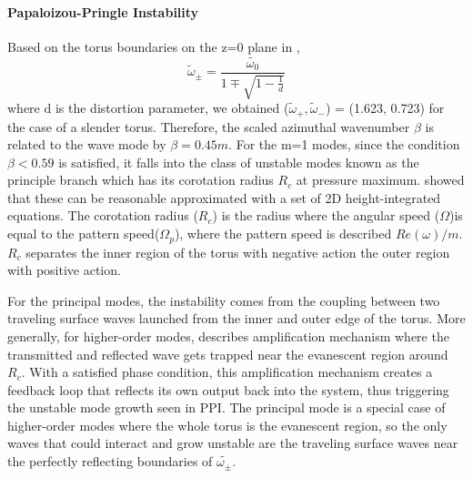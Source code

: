 \documentclass[iop,revtex4]{emulateapj}
\begin{document}
\paragraph*{\rm{\textbf{Papaloizou-Pringle Instability}\\}}
\par Based on the torus boundaries on the z=0 plane in \citep{Papaloizou:1984A},
\begin{equation}
\tilde{\omega}_\pm  = \frac{\tilde{\omega_0}}{1\mp\sqrt{1-\frac{1}{d}}}
\label{boundary}
\end{equation}
where d is the distortion parameter, we obtained ($\tilde{\omega}_+,\tilde{\omega}_-$) = (1.623, 0.723) for the case of a slender torus. Therefore, the scaled azimuthal wavenumber $\beta$ is related to the wave mode by $\beta = 0.45 m $.  For the m=1 modes, since the condition $\beta<0.59$ is satisfied, it falls into the class of unstable modes known as the principle branch which has its corotation radius $R_c$ at pressure maximum. \cite{Goldreich:1986A} showed that these can be reasonable approximated with a set of 2D height-integrated equations. The corotation radius ($R_c$) is the radius where the angular speed ($\Omega$)is equal to the pattern speed($\Omega_p$), where the pattern speed is described $Re(\omega)/m$. $R_c$ separates the inner region of the torus with negative action the outer region with positive action.
\par For the principal modes, the instability comes from the coupling between two traveling surface waves launched from the inner and outer edge of the torus. More generally, for higher-order modes, \cite{Narayan:1987A} describes amplification mechanism where the transmitted and reflected wave gets trapped near the evanescent region around $R_c$. With a satisfied phase condition, this amplification mechanism creates a feedback loop that reflects its own output back into the system, thus triggering the unstable mode growth seen in \ac{PPI}. The principal mode is a special case of higher-order modes where the whole torus is the evanescent region, so the only waves that could interact and grow unstable are the traveling surface waves near the perfectly reflecting boundaries of $\tilde{\omega_\pm}$.
\end{document}
